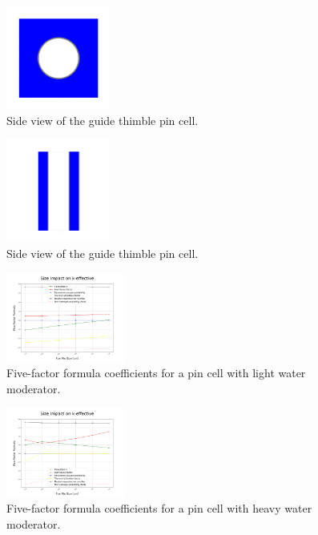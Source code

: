 \documentclass[twocolumn,a4paper,10pt]{article}
\begin{document}
\begin{figure}[ht]
  \centering
  \includegraphics[width=0.3\textwidth]{../Pictures/Thimbleguides_plot_xy.png}
  \caption{Side view of the guide thimble pin cell.}
  \label{fig:guidepin_xy}
\end{figure}

\begin{figure}[ht!]
  \centering
  \includegraphics[width=0.3\textwidth]{../Pictures/Thimbleguides_plot_yz.png}
  \caption{Side view of the guide thimble pin cell.}
  \label{fig:guidepin_yz}
\end{figure}

\begin{figure}[ht]
  \centering
  \includegraphics[width=0.35\textwidth]{../Pin_Cell/Light_Water.png}
  \caption{Five-factor formula coefficients for a pin cell with light water moderator.}
  \label{fig:FFFlight}
\end{figure}

\begin{figure}[ht]
  \centering
  \includegraphics[width=0.35\textwidth]{../Pin_Cell/Heavy_Water.png}
  \caption{Five-factor formula coefficients for a pin cell with heavy water moderator.}
  \label{fig:FFFheavy}
\end{figure}
\end{document}
